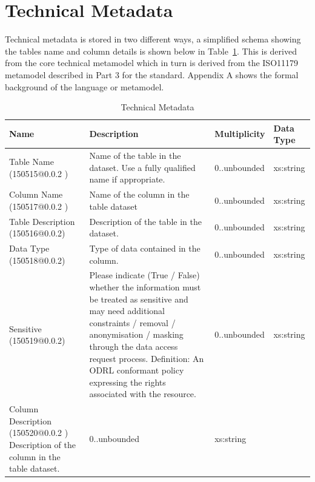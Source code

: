 \documentclass{article}
\begin{document}
\FloatBarrier
\section{Technical Metadata}

Technical metadata is stored in two different ways, a simplified schema showing the tables name and column details is shown below in Table~\ref{}. This is derived from the core technical metamodel which in turn is derived from the ISO11179 metamodel described in Part 3 for the standard. Appendix A shows the formal background of the language or metamodel.

\begin{table}[h]
	\begin{center}
		\caption{Technical Metadata}
		\label{tab:technical}
		\begin{tabular}{ p{3cm} | p{5cm} | p{2cm} | p{2cm}  } 
			\textbf{Name} &	\textbf{Description	}& \textbf{Multiplicity} &	\textbf{Data Type }\\
			\hline
			
			\hline
		Table Name (150515@0.0.2 )&	Name of the table in the dataset. Use a fully qualified name if appropriate.	 & 0..unbounded&	xs:string
\\
		\hline
		Column Name (150517@0.0.2 )	& Name of the column in the table dataset &	0..unbounded &	xs:string
\\
		\hline
		Table Description (150516@0.0.2) &	Description of the table in the dataset. &	0..unbounded &	xs:string
\\ 
		\hline
		Data Type (150518@0.0.2)&	Type of data contained in the column. &	0..unbounded &	xs:string
\\
		\hline
		Sensitive (150519@0.0.2) &	Please indicate (True / False) whether the information must be treated as sensitive and may need additional constraints / removal / anonymisation / masking through the data access request process. Definition: An ODRL conformant policy expressing the rights associated with the resource. &	0..unbounded &	xs:string
\\
		\hline
		Column Description (150520@0.0.2  )	Description of the column in the table dataset.	& 0..unbounded &	xs:string
\\			
		\end{tabular}
	\end{center}
\end{table}





\FloatBarrier
 
\end{document}
